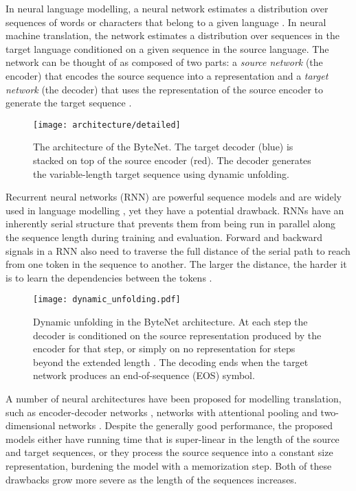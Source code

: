 \documentclass{article}
\begin{document}
In neural language modelling, a neural network estimates a distribution over sequences of words or characters that belong to a given language \citep{bengio:2003}. In neural machine translation, the network estimates a distribution over sequences in the target language conditioned on a given sequence in the source language. The network can be thought of as composed of two parts: a \emph{source network} (the encoder) that encodes the source sequence into a representation and a \emph{target network} (the decoder) that uses the representation of the source encoder to generate the target sequence \citep{kalchbrenner13emnlp}.

\begin{figure}
\centering
\texttt{[image: architecture/detailed]}
\caption{The architecture of the ByteNet. The target decoder (blue) is stacked on top of the source encoder (red). The decoder generates the variable-length target sequence using dynamic unfolding.}
\label{architecture}
\end{figure}

Recurrent neural networks (RNN) are powerful sequence models \citep{hochreiter1997long} and are widely used in language modelling \citep{DBLP:conf/interspeech/MikolovKBCK10}, yet they have a potential drawback. RNNs have an inherently serial structure that prevents them from being run in parallel along the sequence length during training and evaluation. Forward and backward signals in a RNN also need to traverse the full distance of the serial path to reach from one token in the sequence to another. The larger the distance, the harder it is to learn the dependencies between the tokens \citep{chapter-gradient-flow-2001}.

\begin{figure*}
\centering
\texttt{[image: dynamic\_unfolding.pdf]}
\caption{Dynamic unfolding in the ByteNet architecture. At each step the decoder is conditioned on the source representation produced by the encoder for that step, or simply on no representation for steps beyond the extended length . The decoding ends when the target network produces an end-of-sequence (EOS) symbol.}
\label{fig:dynunf}
\end{figure*}

A number of neural architectures have been proposed for modelling translation, such as encoder-decoder networks \citep{kalchbrenner13emnlp, DBLP:conf/nips/SutskeverVL14, DBLP:journals/corr/ChoMGBSB14,kaiser2016active}, networks with attentional pooling \citep{DBLP:journals/corr/BahdanauCB14} and two-dimensional networks \citep{DBLP:journals/corr/KalchbrennerDG15}. Despite the generally good performance, the proposed models either have running time that is super-linear in the length of the source and target sequences, or they process the source sequence into a constant size representation, burdening the model with a memorization step. Both of these drawbacks grow more severe as the length of the sequences increases.
\end{document}
